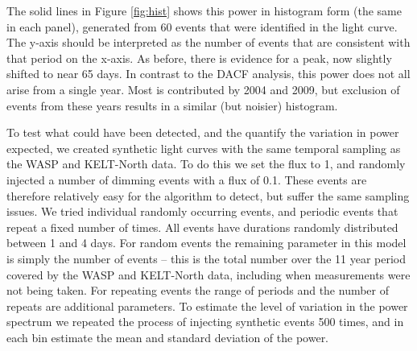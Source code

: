 \documentclass[]{rsos}
\begin{document}


The solid lines in Figure \ref{fig:hist} shows this power in histogram form (the same in
each panel), generated from 60 events that were identified in the light curve. The y-axis
should be interpreted as the number of events that are consistent with that period on the
x-axis. As before, there is evidence for a peak, now slightly shifted to near 65 days. In
contrast to the DACF analysis, this power does not all arise from a single year. Most is
contributed by 2004 and 2009, but exclusion of events from these years results in a
similar (but noisier) histogram.

To test what could have been detected, and the quantify the variation in power expected,
we created synthetic light curves with the same temporal sampling as the WASP and
KELT-North data. To do this we set the flux to 1, and randomly injected a number of
dimming events with a flux of 0.1. These events are therefore relatively easy for the
algorithm to detect, but suffer the same sampling issues. We tried individual randomly
occurring events, and periodic events that repeat a fixed number of times. All events
have durations randomly distributed between 1 and 4 days. For random events the remaining
parameter in this model is simply the number of events -- this is the total number over
the 11 year period covered by the WASP and KELT-North data, including when measurements
were not being taken. For repeating events the range of periods and the number of repeats
are additional parameters. To estimate the level of variation in the power spectrum we
repeated the process of injecting synthetic events 500 times, and in each bin estimate
the mean and standard deviation of the power.
\end{document}
